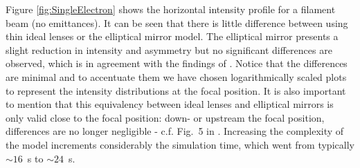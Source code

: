 \documentclass{iucr}              %
\begin{document}


Figure \ref{fig:SingleElectron} shows the horizontal intensity profile for a filament beam (no emittances). It can be seen that there is little difference between using thin ideal lenses or the elliptical mirror model. The elliptical mirror presents a slight reduction in intensity and asymmetry but no significant differences are observed, which is in agreement with the findings of \cite{Canestrari2014}. Notice that the differences are minimal and to accentuate them we have chosen logarithmically scaled plots to represent the intensity distributions at the focal position. It is also important to mention that this equivalency between ideal lenses and elliptical mirrors is only valid close to the focal position: down- or upstream the focal position, differences are no longer negligible - c.f. Fig.~5 in \cite{Canestrari2014}.  Increasing the complexity of the model increments considerably the simulation time, which went from typically $\sim16$~s to $\sim24$~s. 

\end{document}
